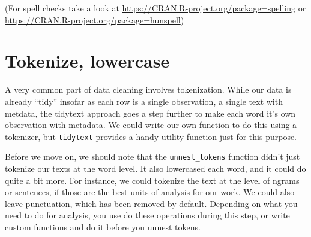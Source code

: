 \documentclass[]{book}
\newenvironment{Shaded}{\begin{snugshade}}{\end{snugshade}}
\newcommand{\KeywordTok}[1]{\textcolor[rgb]{0.13,0.29,0.53}{\textbf{#1}}}
\newcommand{\NormalTok}[1]{#1}
\newcommand{\OperatorTok}[1]{\textcolor[rgb]{0.81,0.36,0.00}{\textbf{#1}}}
\newcommand{\StringTok}[1]{\textcolor[rgb]{0.31,0.60,0.02}{#1}}
\begin{document}
(For spell checks take a look at \url{https://CRAN.R-project.org/package=spelling} or \url{https://CRAN.R-project.org/package=hunspell})

\hypertarget{tokenize-lowercase}{%
\section{Tokenize, lowercase}\label{tokenize-lowercase}}

A very common part of data cleaning involves tokenization. While our data is already ``tidy'' insofar as each row is a single observation, a single text with metdata, the tidytext approach goes a step further to make each word it's own observation with metadata. We could write our own function to do this using a tokenizer, but \texttt{tidytext} provides a handy utility function just for this purpose.

\begin{Shaded}
\end{Shaded}

Before we move on, we should note that the \texttt{unnest\_tokens} function didn't just tokenize our texts at the word level. It also lowercased each word, and it could do quite a bit more. For instance, we could tokenize the text at the level of ngrams or sentences, if those are the best units of analysis for our work. We could also leave punctuation, which has been removed by default. Depending on what you need to do for analysis, you use do these operations during this step, or write custom functions and do it before you unnest tokens.
\end{document}
